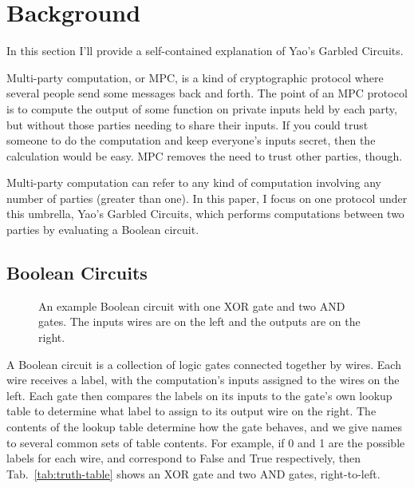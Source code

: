 \section{Background}

In this section I'll provide a self-contained explanation of Yao's Garbled Circuits.

Multi-party computation, or MPC, is a kind of cryptographic protocol where several people send some messages back and forth. The point of an MPC protocol is to compute the output of some function on private inputs held by each party, but without those parties needing to share their inputs. If you could trust someone to do the computation and keep everyone's inputs secret, then the calculation would be easy. MPC removes the need to trust other parties, though.

Multi-party computation can refer to any kind of computation involving any number of parties (greater than one). In this paper, I focus on one protocol under this umbrella, Yao's Garbled Circuits, which performs computations between two parties by evaluating a Boolean circuit.

\subsection{Boolean Circuits}

\begin{figure}[t]
	\centering
	\caption{An example Boolean circuit with one XOR gate and two AND gates. The inputs wires are on the left and the outputs are on the right.}%
	\label{fig:circuit}
\end{figure}

A Boolean circuit is a collection of logic gates connected together by wires. Each wire receives a label, with the computation's inputs assigned to the wires on the left. Each gate then compares the labels on its inputs to the gate's own lookup table to determine what label to assign to its output wire on the right. The contents of the lookup table determine how the gate behaves, and we give names to several common sets of table contents. For example, if 0 and 1 are the possible labels for each wire, and correspond to False and True respectively, then Tab.~\ref{tab:truth-table} shows an XOR gate and two AND gates, right-to-left.

